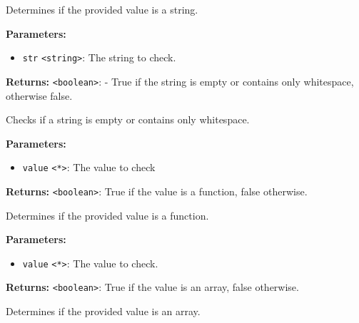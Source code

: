 \documentclass[12pt,a4paper]{article}
\begin{document}
\noindent Determines if the provided value is a string.

\vspace{5mm}
\noindent {}


\noindent \textbf{Parameters:}
\begin{itemize}
  \item \texttt{str} \texttt{<string>}: The string to check.
\end{itemize}

\noindent \textbf{Returns:} \texttt{<boolean>}: - True if the string is empty or contains only whitespace, otherwise false.

\noindent Checks if a string is empty or contains only whitespace.

\vspace{5mm}
\noindent {}


\noindent \textbf{Parameters:}
\begin{itemize}
  \item \texttt{value} \texttt{<*>}: The value to check
\end{itemize}

\noindent \textbf{Returns:} \texttt{<boolean>}: True if the value is a function, false otherwise.

\noindent Determines if the provided value is a function.

\vspace{5mm}
\noindent {}


\noindent \textbf{Parameters:}
\begin{itemize}
  \item \texttt{value} \texttt{<*>}: The value to check.
\end{itemize}

\noindent \textbf{Returns:} \texttt{<boolean>}: True if the value is an array, false otherwise.

\noindent Determines if the provided value is an array.

\vspace{5mm}
\noindent {}
\end{document}
